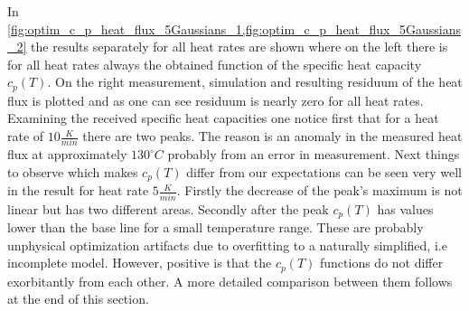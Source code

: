 \documentclass{scrartcl}[12pt, halfparskip]
\numberwithin{equation}{section}
\numberwithin{figure}{section}
\numberwithin{table}{section}
\begin{document}
In \cref{fig:optim_c_p_heat_flux_5Gaussians_1,fig:optim_c_p_heat_flux_5Gaussians_2} the results separately for all heat rates are shown where on the left there is for all heat rates always the obtained function of the specific heat capacity $c_p(T)$. On the right measurement, simulation and resulting residuum of the heat flux is plotted and as one can see residuum is nearly zero for all heat rates. Examining the received specific heat capacities one notice first that for a heat rate of $10 \frac{K}{min}$ there are two peaks. The reason is an anomaly in the measured heat flux at approximately $130^{\circ} C$ probably from an error in measurement. Next things to observe which makes $c_p(T)$ differ from our expectations can be seen very well in the result for heat rate $5 \frac{K}{min}$. Firstly the decrease of the peak's maximum is not linear but has two different areas. Secondly after the peak $c_p(T)$ has values lower than the base line for a small temperature range. These are probably unphysical optimization artifacts due to overfitting to a naturally simplified, i.e incomplete model. However, positive is that the $c_p(T)$ functions do not differ exorbitantly from each other. A more detailed comparison between them follows at the end of this section.
\end{document}
